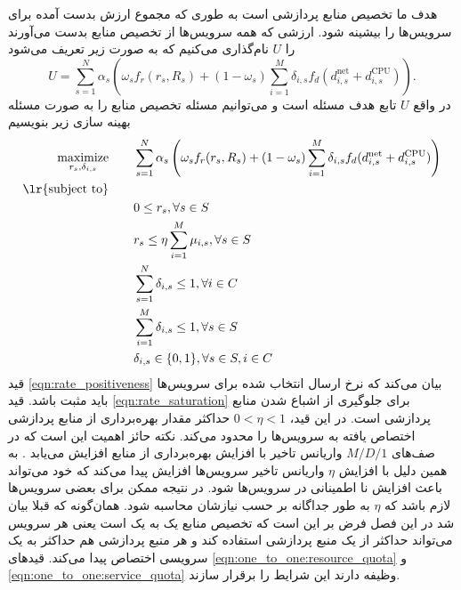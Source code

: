     هدف ما تخصیص منابع پردازشی است به طوری که مجموع ارزش بدست آمده برای سرویس‌ها را بیشینه شود.
    ارزشی که همه سرویس‌ها از تخصیص منابع بدست می‌آورند را $U$ نام‌گذاری می‌کنیم که به صورت زیر تعریف می‌شود
    \begin{equation}
      U = \sum_{s=1}^N \alpha_s \left (\omega_s f_r(r_s, R_s) + (1-\omega_s) \sum_{i=1}^M \delta_{i,s} f_d(d_{i,s}^{\text{net}} + d_{i,s}^{\text{CPU}}) \right).
    \end{equation}
    در واقع $U$ تابع هدف مسئله است و می‌توانیم مسئله تخصیص منابع را به صورت مسئله بهینه سازی زیر بنویسیم
    \begin{subequations}
      \begin{align}
        \underset{r_s, \delta_{i,s}}{\text{maximize}} \qquad & \sum_{s=1}^N \alpha_s \left (\omega_s f_r(r_s, R_s) + (1-\omega_s) \sum_{i=1}^M \delta_{i,s} f_d(d_{i,s}^{\text{net}} + d_{i,s}^{\text{CPU}}) \right ) \\
        \text{\lr{subject  to}} \qquad & \nonumber \\
        & 0 \le r_s, \forall s \in S\label{eqn:rate_positiveness} \\
        & r_s \le \eta \sum_{i=1}^M \mu_{i,s}, \forall s \in S\label{eqn:rate_saturation}\\
        & \sum_{s=1}^N \delta_{i,s} \le 1, \forall i \in C \label{eqn:one_to_one:resource_quota}\\
        & \sum_{i=1}^M \delta_{i,s} \le 1, \forall s \in S \label{eqn:one_to_one:service_quota}\\
        & \delta_{i,s} \in \{0, 1\}, \forall s \in S, i \in C
      \end{align}
    \end{subequations}
    قید \eqref{eqn:rate_positiveness} بیان می‌کند که نرخ ارسال انتخاب شده برای سرویس‌ها باید مثبت باشد.
    قید \eqref{eqn:rate_saturation} برای جلوگیری از اشباع شدن منابع پردازشی است.
    در این قید، $0 < \eta < 1$ حداکثر مقدار بهره‌برداری از منابع پردازشی اختصاص یافته به سرویس‌ها را محدود می‌کند.
    نکته حائز اهمیت این است که در صف‌های $M/D/1$ واریانس تاخیر با افزایش بهره‌برداری از منابع افزایش می‌یابد \cite{basic_queueing_sztrik}.
    به همین دلیل با افزایش $\eta$ واریانس تاخیر سرویس‌ها افزایش پیدا می‌کند که خود می‌تواند باعث افزایش نا اطمینانی در سرویس‌ها شود.
    در نتیجه ممکن برای بعضی سرویس‌ها لازم باشد که $\eta$ به طور جداگانه بر حسب نیازشان محاسبه شود.
    همان‌گونه که قبلا بیان شد در این فصل فرض بر این است که تخصیص منابع یک به یک است یعنی هر سرویس می‌تواند حداکثر از یک منبع پردازشی استفاده کند و هر منبع پردازشی هم حداکثر به یک سرویسی اختصاص پیدا می‌کند.
    قید‌های \eqref{eqn:one_to_one:resource_quota} و \eqref{eqn:one_to_one:service_quota} وظیفه دارند این شرایط را برقرار سازند.
        
